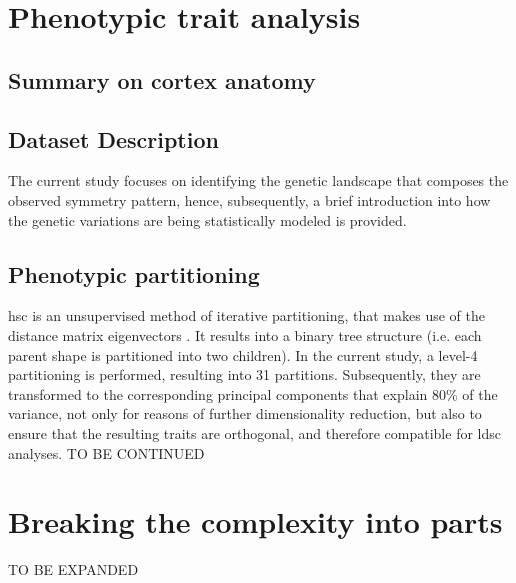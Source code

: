 \section{Phenotypic trait analysis}\label{sec:phenotype_intro}
\subsection{Summary on cortex anatomy}
 
\subsection{Dataset Description}
 

The current study focuses on identifying the genetic landscape that composes the observed symmetry pattern, hence, subsequently, a brief introduction into how the genetic variations are being statistically modeled is provided.







\subsection{Phenotypic partitioning}\label{sec:hsc}
\Acf{hsc} is an unsupervised method of iterative partitioning, that makes use of the distance matrix eigenvectors \cite{Ng2002}. It results into a binary tree structure (i.e. each parent shape is partitioned into two children). In the current study, a level-4 partitioning is performed, resulting into 31 partitions. Subsequently, they are transformed to the corresponding principal components that explain 80\% of the variance, not only for reasons of further dimensionality reduction, but also to ensure that the resulting traits are orthogonal, and therefore compatible for \ac{ldsc} analyses. TO BE CONTINUED




\section{Breaking the complexity into parts}
TO BE EXPANDED

